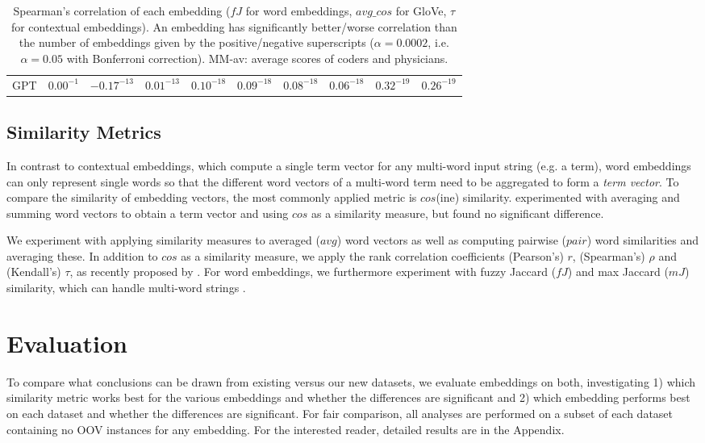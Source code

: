 \documentclass[letterpaper]{article} %
\begin{document}
\begin{table*}[th]
\begin{tabular}{l l l l l l l l l l}
GPT & $0.00^{-1}$ & $-0.17^{-13}$ & $0.01^{-13}$ & $0.10^{-18}$ & $0.09^{-18}$ & $0.08^{-18}$ & $0.06^{-18}$ & $0.32^{-19}$ & $0.26^{-19}$ \\
    \end{tabular}
    \caption{Spearman's correlation of each embedding ($fJ$ for word embeddings, $avg\_cos$ for GloVe, $\tau$ for contextual embeddings).
    An embedding has significantly better/worse correlation than the number of embeddings given by the positive/negative superscripts ($\alpha = 0.0002$, i.e. $\alpha = 0.05$ with Bonferroni correction). MM-av: average scores of coders and physicians.}
    \label{tab:significance_existingDatasets} 
\end{table*}

\subsection{Similarity Metrics}
In contrast to contextual embeddings, which compute a single term vector for any multi-word input string (e.g. a term), word embeddings can only represent single words so that the different word vectors of a multi-word term need to be aggregated to form a \emph{term vector}. To compare the similarity of embedding vectors, the most commonly applied metric is $cos$(ine) similarity.
\citeauthor{HenryCM2018} 
experimented with averaging and summing word vectors to obtain a term vector and using $cos$ as a similarity measure, but found no significant difference.

We experiment with applying similarity measures to averaged ($avg$) word vectors as well as computing pairwise ($pair$) word similarities and averaging these. 
In addition to $cos$ as a similarity measure, we apply the rank correlation coefficients (Pearson's) $r$, (Spearman's) $\rho$ and (Kendall's) $\tau$, as recently proposed by \citeauthor{ZhelezniakEtAl2019-correlation} .
For word embeddings, we furthermore experiment with fuzzy Jaccard ($fJ$) 
and max Jaccard ($mJ$) similarity, which can handle multi-word strings \cite{ZhelezniakEtAl2019-fuzzyJaccard}.


\section{Evaluation}
To compare what conclusions can be drawn from existing versus our new datasets, we evaluate embeddings on both, investigating 1) which similarity metric works best for the various embeddings and whether the differences are significant and 2) which embedding performs best on each dataset and whether the differences are significant.
For fair comparison, all analyses are performed on a subset of each dataset containing no OOV instances for any embedding.
For the interested reader, detailed results are in the Appendix.
\end{document}
